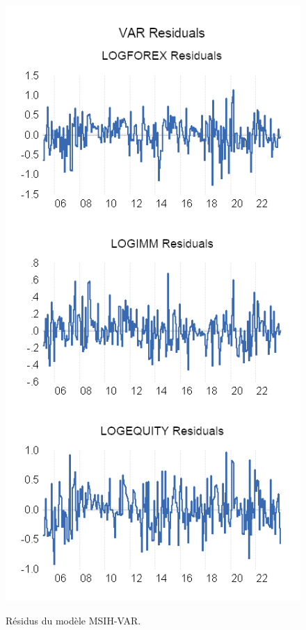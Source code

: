 \begin{figure}[H]
    \centering
    \caption{Résidus du modèle MSIH-VAR.}
    \includegraphics[scale=0.9]{annexes/msih_residuals.png}
    \label{fig:msih_resids}
\end{figure}

